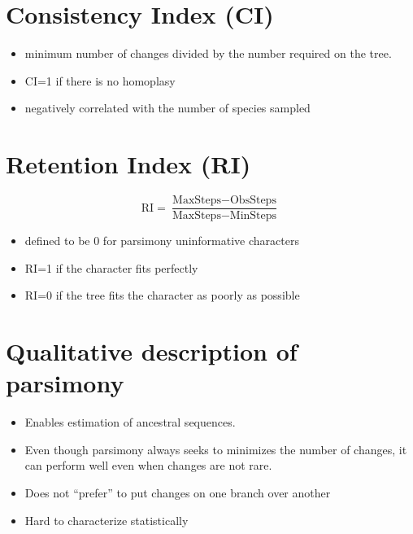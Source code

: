 \documentclass[landscape]{foils}
\begin{document}
\pagecolor{white}
\unitlength=1mm



\myNewSlide
\section*{Consistency Index (CI)}
\begin{itemize}
	\item minimum number of changes divided by the number required on the tree.
	\item CI=1 if there is no homoplasy
	\item negatively correlated with the number of species sampled
\end{itemize}

\myNewSlide
\section*{Retention Index (RI)}
 \[\mbox{RI} = \frac{\mbox{MaxSteps}-\mbox{ObsSteps}}{\mbox{MaxSteps}-\mbox{MinSteps}}\] 
\begin{itemize}
	\item defined to be 0 for parsimony uninformative characters
	\item RI=1 if the character fits perfectly
	\item RI=0 if the tree fits the character as poorly as possible
\end{itemize}

\myNewSlide
\section*{Qualitative description of parsimony}
\begin{itemize}
	\item Enables estimation of ancestral sequences.
	\item Even though parsimony always seeks to minimizes the number of changes, it can perform well even when changes are not rare. 
	\item Does not ``prefer'' to put changes on one branch over another
	\item Hard to characterize statistically
\end{itemize}
\end{document}
